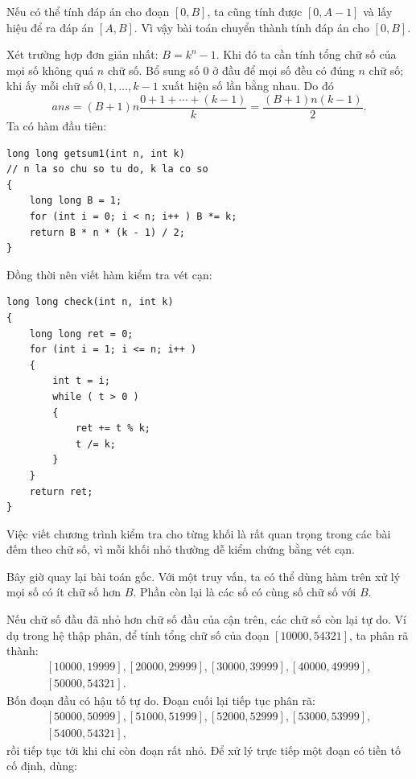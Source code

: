 \documentclass[11pt]{article}
\begin{document}
Nếu có thể tính đáp án cho đoạn \([0,B]\), ta cũng tính được \([0,A-1]\) và
lấy hiệu để ra đáp án \([A,B]\). Vì vậy bài toán chuyển thành tính đáp án cho
\([0,B]\).

Xét trường hợp đơn giản nhất: \(B=k^n-1\). Khi đó ta cần tính tổng chữ số của
mọi số không quá \(n\) chữ số. Bổ sung số \(0\) ở đầu để mọi số đều có đúng
\(n\) chữ số; khi ấy mỗi chữ số \(0,1,\ldots,k-1\) xuất hiện số lần bằng nhau.
Do đó
\[
  \mathit{ans}
  =(B+1)n\frac{0+1+\cdots+(k-1)}{k}
  =\frac{(B+1)n(k-1)}{2}.
\]
Ta có hàm đầu tiên:

\begin{verbatim}
long long getsum1(int n, int k)
// n la so chu so tu do, k la co so
{
    long long B = 1;
    for (int i = 0; i < n; i++ ) B *= k;
    return B * n * (k - 1) / 2;
}
\end{verbatim}

Đồng thời nên viết hàm kiểm tra vét cạn:

\begin{verbatim}
long long check(int n, int k)
{
    long long ret = 0;
    for (int i = 1; i <= n; i++ )
    {
        int t = i;
        while ( t > 0 )
        {
            ret += t % k;
            t /= k;
        }
    }
    return ret;
}
\end{verbatim}

Việc viết chương trình kiểm tra cho từng khối là rất quan trọng trong các bài
đếm theo chữ số, vì mỗi khối nhỏ thường dễ kiểm chứng bằng vét cạn.

Bây giờ quay lại bài toán gốc. Với một truy vấn, ta có thể dùng hàm trên xử lý
mọi số có ít chữ số hơn \(B\). Phần còn lại là các số có cùng số chữ số với
\(B\).

Nếu chữ số đầu đã nhỏ hơn chữ số đầu của cận trên, các chữ số còn lại tự do.
Ví dụ trong hệ thập phân, để tính tổng chữ số của đoạn \([10000,54321]\), ta
phân rã thành:
\[
\begin{gathered}
[10000,19999], [20000,29999], [30000,39999], [40000,49999],\\
[50000,54321].
\end{gathered}
\]
Bốn đoạn đầu có hậu tố tự do. Đoạn cuối lại tiếp tục phân rã:
\[
\begin{gathered}
[50000,50999], [51000,51999], [52000,52999], [53000,53999],\\
[54000,54321],
\end{gathered}
\]
rồi tiếp tục tới khi chỉ còn đoạn rất nhỏ. Để xử lý trực tiếp một đoạn có tiền
tố cố định, dùng:
\end{document}
